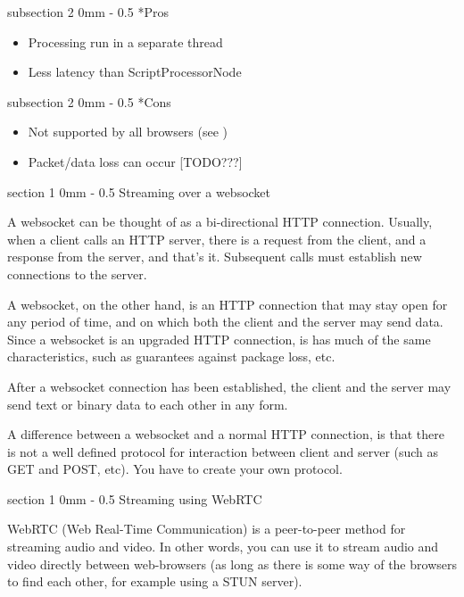 \documentclass[11pt, a4paper, twoside]{article}
\makeatletter
\renewcommand{\subsection}{\@startsection
  {subsection}%
  {2}%
  {0mm}%
  {-\baselineskip}%
  {0.5\baselineskip}%
  {\bfseries\sffamily\large}}%
\renewcommand{\section}{\@startsection
  {section}%
  {1}%
  {0mm}%
  {-\baselineskip}%
  {0.5\baselineskip}%
  {\bfseries\sffamily\Large}}%
\makeatother
\begin{document}
\subsection*{Pros}
\begin{itemize}
\item Processing run in a separate thread
\item Less latency than ScriptProcessorNode
\end{itemize}

\subsection*{Cons}
\begin{itemize}
\item Not supported by all browsers (see \cite{audioworklet})
\item Packet/data loss can occur [TODO???]
\end{itemize}



\section{Streaming over a websocket}

A websocket can be thought of as a bi-directional HTTP
connection. Usually, when a client calls an HTTP server, there is a
request from the client, and a response from the server, and that's
it. Subsequent calls must establish new connections to the server.

A websocket, on the other hand, is an HTTP connection that may stay
open for any period of time, and on which both the client and the
server may send data. Since a websocket is an upgraded HTTP
connection, is has much of the same characteristics, such as
guarantees against package loss, etc.

After a websocket connection has been established, the
client and the server may send text or binary data to each other in
any form.

A difference between a websocket and a normal HTTP connection, is that
there is not a well defined protocol for interaction between client
and server (such as GET and POST, etc). You have to create your own
protocol. 


\section{Streaming using WebRTC}

WebRTC (Web Real-Time Communication) \cite{webrtc} is a peer-to-peer method for
streaming audio and video. In other words, you can use it to stream
audio and video directly between web-browsers (as long as there is
some way of the browsers to find each other, for example using a STUN
server).
\end{document}
